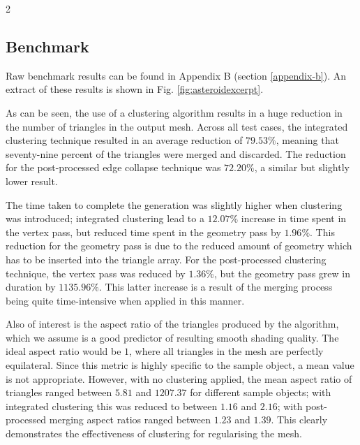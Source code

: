 \documentclass[]{article}
\begin{document}
\FloatBarrier
\pagebreak
\begin{multicols}{2}

\subsection{Benchmark}\label{benchmark-results}

Raw benchmark results can be found in Appendix B (section \ref{appendix-b}). An extract of these results is shown in Fig. \ref{fig:asteroidexcerpt}.

As can be seen, the use of a clustering algorithm results in a huge reduction in the number of triangles in the output mesh. Across all test cases, the integrated clustering technique resulted in an average reduction of $79.53\%$, meaning that seventy-nine percent of the triangles were merged and discarded. The reduction for the post-processed edge collapse technique was $72.20\%$, a similar but slightly lower result.

The time taken to complete the generation was slightly higher when clustering was introduced; integrated clustering lead to a $12.07\%$ increase in time spent in the vertex pass, but reduced time spent in the geometry pass by $1.96\%$. This reduction for the geometry pass is due to the reduced amount of geometry which has to be inserted into the triangle array. For the post-processed clustering technique, the vertex pass was reduced by $1.36\%$, but the geometry pass grew in duration by $1135.96\%$. This latter increase is a result of the merging process being quite time-intensive when applied in this manner.

Also of interest is the aspect ratio of the triangles produced by the algorithm, which we assume is a good predictor of resulting smooth shading quality. The ideal aspect ratio would be $1$, where all triangles in the mesh are perfectly equilateral. Since this metric is highly specific to the sample object, a mean value is not appropriate. However, with no clustering applied, the mean aspect ratio of triangles ranged between $5.81$ and $1207.37$ for different sample objects; with integrated clustering this was reduced to between $1.16$ and $2.16$; with post-processed merging aspect ratios ranged between $1.23$ and $1.39$. This clearly demonstrates the effectiveness of clustering for regularising the mesh.

\end{multicols}
\end{document}
